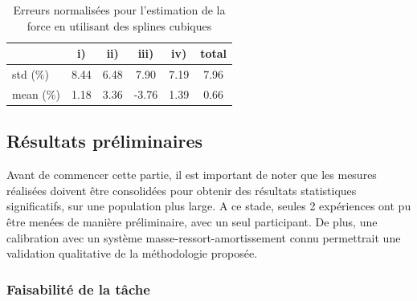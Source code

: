 \documentclass[12pt, a4paper]{article} %
\numberwithin{equation}{section}
\begin{document}
%

%
\begin{table}[]
	\centering
	\begin{tabular}{l|c c c c|c}
		\multicolumn{1}{c|}{} & i)   & ii)  & iii) & iv) & total \\
		\hline
		std (\%)             & 8.44 & 6.48 & 7.90 & 7.19 & 7.96  \\
		mean (\%)            & 1.18 & 3.36 &-3.76 & 1.39 & 0.66  \\
	\end{tabular}
	\caption{Erreurs normalisées pour l'estimation de la force en utilisant des splines cubiques}
	\label{tab_sline_force_errors}
\end{table}
%
%

\subsection{Résultats préliminaires} \label{sec_impedance_estimation_sub_results}

Avant de commencer cette partie, il est important de noter que les mesures réalisées doivent être consolidées pour obtenir des résultats statistiques significatifs, sur une population plus large. A ce stade, seules 2 expériences ont pu être menées de manière préliminaire, avec un seul participant. De plus, une calibration avec un système masse-ressort-amortissement connu permettrait une validation qualitative de la méthodologie proposée.

\subsubsection{Faisabilité de la tâche}
\label{sec_impedance_estimation_sub_results_sub_task_feasibility}
\end{document}
